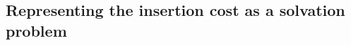 \documentclass[11pt,twoside]{report}
\begin{document}

\subsection{Representing the insertion cost as a solvation problem}
\label{sec:insertion-as-solvation}
\end{document}
